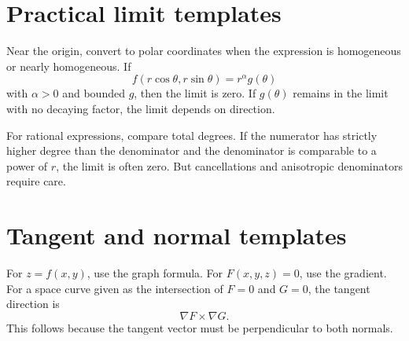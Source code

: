 \section{Practical limit templates}

Near the origin, convert to polar coordinates when the expression is homogeneous or nearly homogeneous.  If
\[
  f(r\cos\theta,r\sin\theta)=r^\alpha g(\theta)
\]
with $\alpha>0$ and bounded $g$, then the limit is zero.  If $g(\theta)$ remains in the limit with no decaying factor, the limit depends on direction.

For rational expressions, compare total degrees.  If the numerator has strictly higher degree than the denominator and the denominator is comparable to a power of $r$, the limit is often zero.  But cancellations and anisotropic denominators require care.

\section{Tangent and normal templates}

For $z=f(x,y)$, use the graph formula.  For $F(x,y,z)=0$, use the gradient.  For a space curve given as the intersection of $F=0$ and $G=0$, the tangent direction is
\[
  \nabla F\times \nabla G.
\]
This follows because the tangent vector must be perpendicular to both normals.

